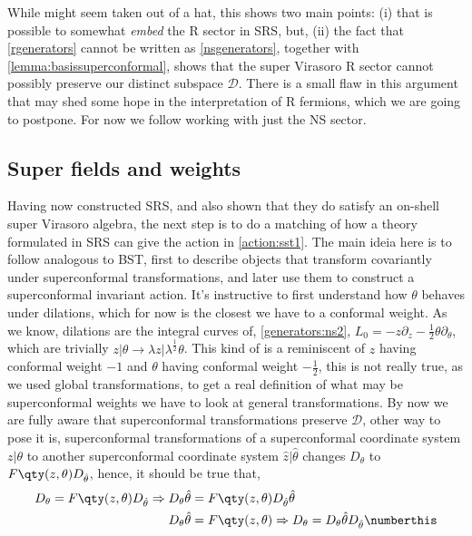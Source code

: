 While might seem taken out of a hat, this shows two main points: (i) that is possible to somewhat \textit{embed} the R sector in SRS, but, (ii) the fact that \eqref{rgenerators} cannot be written 
as \eqref{nsgenerators}, together with \cref{lemma:basissuperconformal}, shows that the super Virasoro R sector cannot possibly 
preserve our distinct subspace $\mathcal D$. There is a small flaw in this argument that may shed some hope in the interpretation of 
R fermions, which we are going to postpone. For now we follow working with just the NS sector.

\subsection{Super fields and weights}

Having now constructed SRS, and also shown that they do satisfy an on-shell super Virasoro algebra, the next step is to 
do a matching of how a theory formulated in SRS can give the action in \cref{action:sst1}. 
The main ideia here is to follow analogous to BST, first to describe objects that transform covariantly 
under superconformal transformations, and later use them to construct a superconformal invariant action. It's instructive 
to first understand how $\theta$ behaves under dilations, which for now is the closest we have to a conformal weight. 
As we know, dilations are the integral curves of, \cref{generators:ns2}, $L_0=-z\partial_z-\frac12\theta\partial_\theta$, 
which are trivially $z|\theta\rightarrow \lambda z|\lambda^{\frac12}\theta$. This kind of is a reminiscent of $z$ having 
conformal weight $-1$ and $\theta$ having conformal weight $-\frac12$, this is not really true, as we used global transformations, 
to get a real definition of what may be superconformal weights we have to look at general transformations. By now we are fully 
aware that superconformal transformations preserve $\mathcal D$, other way to pose it is, superconformal transformations of 
a superconformal coordinate system $z|\theta$ to another superconformal coordinate system $\hat z|\hat\theta$ changes $D_\theta$ to 
$F\qty(z,\theta)D_{\hat\theta}$, hence, it should be true that,
\begin{align*}
    D_\theta=F\qty(z,\theta)D_{\hat\theta}\Rightarrow D_\theta\hat\theta&=F\qty(z,\theta)D_{\hat\theta}\hat\theta\\
    D_\theta\hat\theta&=F\qty(z,\theta)\Rightarrow D_\theta=D_\theta\hat\theta D_{\hat\theta}\numberthis\label{superconformal:definition}
\end{align*}

